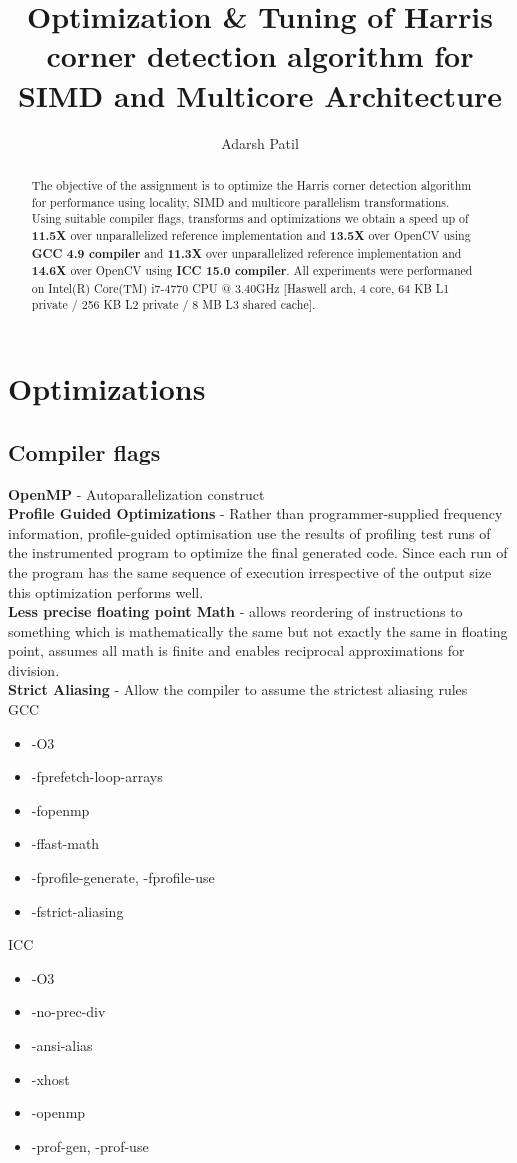 \documentclass[]{article}
\title{Optimization \& Tuning of Harris corner detection algorithm for SIMD and Multicore Architecture}
\author{Adarsh Patil}
\begin{document}
\maketitle

\begin{abstract}
The objective of the assignment is to optimize the Harris corner detection algorithm for performance using locality, SIMD and multicore parallelism transformations. \\
Using suitable compiler flags, transforms and optimizations we obtain a speed up of \textbf{11.5X} over unparallelized reference implementation and \textbf{13.5X} over OpenCV using \textbf{GCC 4.9 compiler} and \textbf{11.3X} over unparallelized reference implementation and \textbf{14.6X} over OpenCV using \textbf{ICC 15.0 compiler}. All experiments were performaned on  Intel(R) Core(TM) i7-4770 CPU @ 3.40GHz [Haswell \SIUnitSymbolMicro arch, 4 core, 64 KB L1 private / 256 KB L2 private / 8 MB L3 shared cache].
\end{abstract}

\section{Optimizations}
\subsection{Compiler flags}
\textbf{OpenMP} - Autoparallelization construct \\
\textbf{Profile Guided Optimizations} - Rather than programmer-supplied frequency information, profile-guided optimisation use the results of profiling test runs of the instrumented program to optimize the final generated code. Since each run of the program has the same sequence of execution irrespective of the output size this optimization performs well.\\
\textbf{Less precise floating point Math} - allows reordering of instructions to something which is mathematically the same but not exactly the same in floating point, assumes all math is finite and enables reciprocal approximations for division. \\
\textbf{Strict Aliasing} - Allow the compiler to assume the strictest aliasing rules \\

GCC
\begin{itemize}
\item -O3
\item -fprefetch-loop-arrays
\item -fopenmp
\item -ffast-math
\item -fprofile-generate, -fprofile-use
\item -fstrict-aliasing
\end{itemize}
ICC
\begin{itemize}
\item -O3
\item -no-prec-div
\item -ansi-alias
\item -xhost
\item -openmp
\item -prof-gen, -prof-use
\end{itemize}
\end{document}
